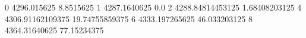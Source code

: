 0 4296.015625 8.8515625
1 4287.1640625 0.0
2 4288.84814453125 1.68408203125
4 4306.91162109375 19.74755859375
6 4333.197265625 46.033203125
8 4364.31640625 77.15234375
